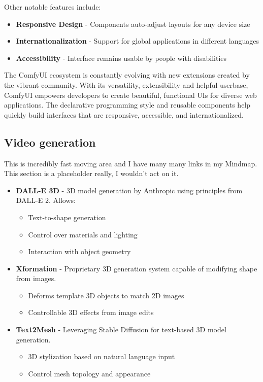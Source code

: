 Other notable features include:

\begin{itemize}
\item \textbf{Responsive Design} - Components auto-adjust layouts for any device size
\item \textbf{Internationalization} - Support for global applications in different languages
\item \textbf{Accessibility} - Interface remains usable by people with disabilities
\end{itemize}

The ComfyUI ecosystem is constantly evolving with new extensions created by the vibrant community. With its versatility, extensibility and helpful userbase, ComfyUI empowers developers to create beautiful, functional UIs for diverse web applications. The declarative programming style and reusable components help quickly build interfaces that are responsive, accessible, and internationalized. 

\subsection{Video generation}


This is incredibly fast moving area and I have many many links in my Mindmap. This section is a placeholder really, I wouldn't act on it.

\begin{itemize}
\item \textbf{DALL-E 3D} - 3D model generation by Anthropic using principles from DALL-E 2. Allows:
\begin{itemize}
\item Text-to-shape generation
\item Control over materials and lighting
\item Interaction with object geometry
\end{itemize}

\item \textbf{Xformation} - Proprietary 3D generation system capable of modifying shape from images.
\begin{itemize}
\item Deforms template 3D objects to match 2D images
\item Controllable 3D effects from image edits
\end{itemize}

\item \textbf{Text2Mesh} - Leveraging Stable Diffusion for text-based 3D model generation.
\begin{itemize}
\item 3D stylization based on natural language input
\item Control mesh topology and appearance
\end{itemize}

\end{itemize}


